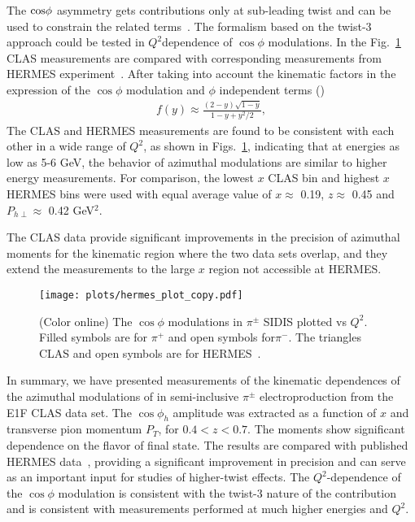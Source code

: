 \documentclass[aps,prl,twocolumn,showpacs,superscriptaddress,groupedaddress]{revtex4}  %
\newcommand{\Phperp}{P_{h\perp}}
\newcommand{\xbj}{x}
\begin{document}
The $\rm cos \phi$ asymmetry gets contributions only at sub-leading twist and can be used to constrain the related terms~\cite{Cahn:1978se,Anselmino:2005nn,Berger:1979xz}.
The formalism based on the twist-3 approach could be tested in $Q^2$dependence of $\cos\phi$ modulations.  In the Fig.~\ref{fig:clas-hermes}  CLAS measurements are compared with corresponding measurements from HERMES experiment~\cite{Airapetian:2012yg}.
After taking into account the kinematic factors in the expression
of the $\cos\phi$ modulation and $\phi$ independent terms (\cite{Bacchetta:2006tn})
\begin{eqnarray}
f(y)\approx \frac{(2-y)\sqrt{1-y}}{1-y+y^{2}/2} ,
\label{fy}
\end{eqnarray}
The CLAS and HERMES measurements are found to 
be consistent with each other in a wide range of $Q^2$, as shown in Figs.~\ref{fig:clas-hermes}, indicating that at energies as low as 5-6 GeV, the
behavior of azimuthal modulations are similar to higher energy measurements. 
For comparison, the lowest $\xbj$ CLAS bin and highest $\xbj$ HERMES bins were used with equal average value of $\xbj\approx$ 0.19, $z\approx$ 0.45 and $\Phperp\approx$ 0.42 GeV$^2$.

The CLAS data provide
significant improvements in the precision of azimuthal moments  for the kinematic region where the two data
sets overlap, and they extend the measurements to the large $\xbj$ region not accessible at HERMES.
\begin{figure}[h]
\begin{center}
\texttt{[image: plots/hermes\_plot\_copy.pdf]}
\end{center}
\caption{(Color online) The $\cos\phi$ modulations in $\pi^\pm$ SIDIS plotted vs $Q^2$. Filled symbols are for $\pi^+$ and open symbols for$\pi^-$.
The triangles CLAS and open symbols are for HERMES~\cite{Airapetian:2012yg}.}
\label{fig:clas-hermes}
\end{figure}


 

In summary, we have presented measurements of the kinematic dependences
 of the azimuthal modulations of  in semi-inclusive $\pi ^\pm$ electroproduction from the E1F CLAS data set. 
The $\cos \phi_h$ amplitude was extracted as a function of $\xbj$ and transverse pion 
momentum $P_T$, for  $0.4<z<0.7$.
The  moments show significant  dependence on the flavor of final state. The results are compared with published HERMES data~\cite{Airapetian:2012yg}, 
providing  a significant improvement in precision and can serve as an important input for studies of higher-twist effects.
The  $Q^2$-dependence of the $\cos\phi$ modulation is consistent with 
the twist-3 nature of the contribution and is consistent with measurements performed at much higher energies and $Q^2$.
\end{document}
